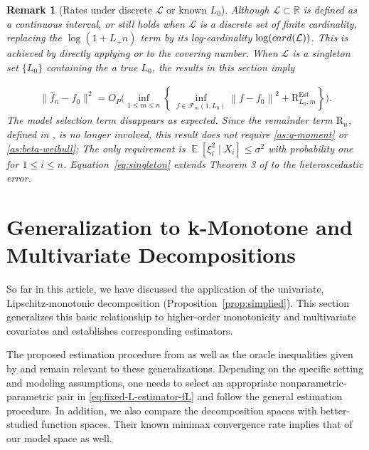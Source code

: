 \documentclass[12pt]{article}
\DeclareMathOperator*{\E}{\mathbb{E}}
\newtheorem{remark}{Remark}[section]
\begin{document}
\begin{remark}[Rates under discrete $\mathcal{L}$ or known $L_0$]\label{remark:known-L}
Although $\mathcal{L}\subset\mathbb{R}$ is defined as a continuous interval,  or   still holds when $\mathcal{L}$ is a discrete set of finite cardinality, replacing the $\log \left(1+L_{+} n\right)$ term by its log-cardinality $\log({\rm card}(\mathcal{L}))$. This is achieved by directly applying  or  to the covering number. When $\mathcal{L}$ is a singleton set $\{L_0\}$ containing the a true $L_0$, the results in this section imply

\begin{align}\label{eq:singleton}
\|\widehat f_n - f_0\|^2 = O_P\bigg(\inf _{1 \leq m \leq n}\left\{ \, \inf _{f \in \mathcal{F}_m(1, L_0)}\left\|f-f_0\right\|^2+ 
\mathrm{R}_{L_0,m}^{\mathrm{Est}}\right\}\bigg).
\end{align}
The model selection term disappears as expected. Since the remainder term $\mathrm{R}_n$, defined in , is no longer involved, this result does not require \ref{as:q-moment} or \ref{as:beta-weibull}; The only requirement is $\E[\xi^2_i\mid X_i]\le \sigma^2$ with probability one for $1 \le i \le n$. Equation~\eqref{eq:singleton} extends Theorem 3 of \cite{han2019convergence} to the heteroscedastic error. 
\end{remark}

\section{Generalization to k-Monotone and Multivariate Decompositions}\label{sec:decomposition}

So far in this article, we have discussed the application of the univariate, Lipschitz-monotonic decomposition (Proposition~\ref{prop:simplied}). This section generalizes this basic relationship to higher-order monotonicity and multivariate covariates and establishes corresponding estimators.

The proposed estimation procedure from  as well as the oracle inequalities given by  and  remain relevant to these generalizations. Depending on the specific setting and modeling assumptions, one needs to select an appropriate nonparametric-parametric pair in \eqref{eq:fixed-L-estimator-fL} and follow the general estimation procedure. In addition, we also compare the decomposition spaces with better-studied function spaces. Their known minimax convergence rate implies that of our model space as well.
\end{document}
